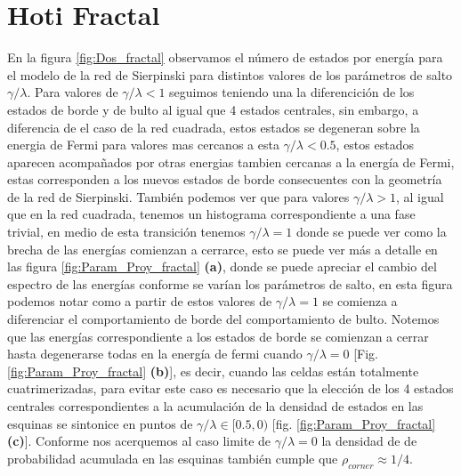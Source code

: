 \section{Hoti Fractal}




En la figura \ref{fig:Dos_fractal} observamos el número de estados por energía para el modelo de la red de Sierpinski para distintos valores de los parámetros de salto $\gamma/\lambda$. Para valores de $\gamma/\lambda < 1$ seguimos teniendo una la diferencición de los estados de borde y de bulto al igual que 4 estados centrales, sin embargo, a diferencia de el caso de la red cuadrada, estos estados se degeneran sobre la energia de Fermi para valores mas cercanos a esta  $\gamma/\lambda < 0.5$, estos estados aparecen acompañados por otras energias tambien cercanas a la energía de Fermi, estas corresponden a los nuevos estados de borde consecuentes con la geometría de la red de Sierpinski. También podemos ver que para valores $\gamma/\lambda > 1$, al igual que en la red cuadrada, tenemos un histograma correspondiente a una fase trivial, en medio de esta transición tenemos $\gamma/\lambda = 1$ donde se puede ver como la brecha de las energías comienzan a cerrarce, esto se puede ver más a detalle en las figura \ref{fig:Param_Proy_fractal} \textbf{(a)}, donde se puede apreciar el cambio del espectro de las energías conforme se varían los parámetros de salto, en esta figura podemos notar como a partir de estos valores de $\gamma/\lambda = 1$ se comienza a diferenciar el comportamiento de borde del comportamiento de bulto. Notemos que las energías correspondiente a los estados de borde se comienzan a cerrar hasta degenerarse todas en la energía de fermi cuando $\gamma/\lambda = 0$ [Fig. \ref{fig:Param_Proy_fractal} \textbf{(b)}], es decir, cuando las celdas están totalmente cuatrimerizadas, para evitar este caso es necesario que la elección de los 4 estados centrales correspondientes a la acumulación de la densidad de estados en las esquinas se sintonice en puntos de $\gamma/\lambda \in [0.5,0)$ [fig. \ref{fig:Param_Proy_fractal} \textbf{(c)}]. Conforme nos acerquemos al caso limite de $\gamma/\lambda = 0$ la densidad de de probabilidad acumulada en las esquinas también cumple que $\rho_{corner} \approx 1/4$.




